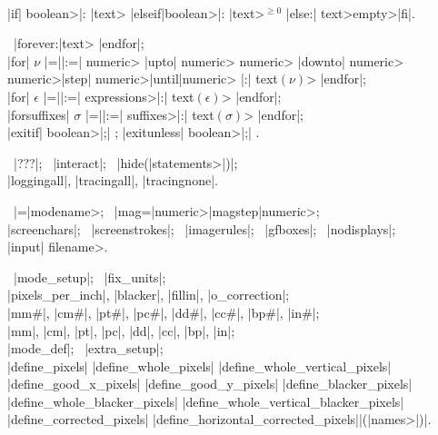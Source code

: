 \medbreak\textindent{}\\
|if| \<boolean>|: |\<text> \bb|elseif|\<boolean>|: |\<text>\ee$^{\ge0}$%
\bb|else:| \<text>\cr\<empty>\ee|fi|.

\smallbreak\textindent{} \ |forever:|\<text> |endfor|;\\
|for| $\nu$ \bb|=|\cr|:=|\ee
\bb\<numeric> |upto| \<numeric>\cr
 \<numeric> |downto| \<numeric>\cr
 \<numeric>\thinspace|step|\thinspace
  \<numeric>\thinspace|until|\thinspace\<numeric>\ee
|:| \<text$(\nu)$> |endfor|;\\
|for| $\epsilon$ \bb|=|\cr|:=|\ee
 \<expressions>|:| \<text$(\epsilon)$> |endfor|;\\
|forsuffixes| $\sigma$ \bb|=|\cr|:=|\ee
 \<suffixes>|:| \<text$(\sigma)$> |endfor|;\\
|exitif| \<boolean>|;| ; \quad
|exitunless| \<boolean>|;| .

\medbreak\textindent{} \
|???|; \ |interact|; \
|hide(|\<statements>|)|;\\
|loggingall|, |tracingall|, |tracingnone|.

\textindent{} \
|\mode=|\<modename>; \ |mag=|\bb\<numeric>\cr|magstep|\<numeric>\ee;\\
|screenchars|; \ |screenstrokes|; \ |imagerules|; \ |gfboxes|; \
|nodisplays|;\\
|input| \<filename>.

\medbreak\textindent\bull {\it ^{Conversion to pixel units}:\/} \
|mode_setup|; \ |fix_units|;\\
|pixels_per_inch|, |blacker|, |fillin|, |o_correction|;\\
|mm#|, |cm#|, |pt#|, |pc#|, |dd#|, |cc#|, |bp#|, |in#|;\\
|mm|, |cm|, |pt|, |pc|, |dd|, |cc|, |bp|, |in|;\\
|mode_def|; \ |extra_setup|;\\
\bb|define_pixels|\cr
|define_whole_pixels|\cr
|define_whole_vertical_pixels|\cr
|define_good_x_pixels|\cr
|define_good_y_pixels|\cr
|define_blacker_pixels|\cr
|define_whole_blacker_pixels|\cr
|define_whole_vertical_blacker_pixels|\cr
|define_corrected_pixels|\cr
|define_horizontal_corrected_pixels|\ee|(|\<names>|)|.

